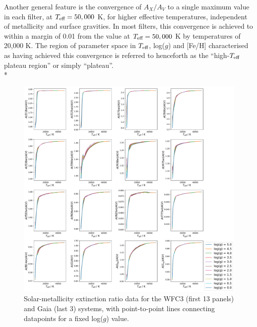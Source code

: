 \documentclass[12pt, a4paper]{report}
\begin{document}
Another general feature is the convergence of $A_{X}/A_{V}$ to a single maximum value in each filter, at $T_{\textnormal{eff}} = 50,000$ K, for higher effective temperatures, independent of metallicity and surface gravities. In most filters, this convergence is achieved to within a margin of 0.01 from the value at $T_{\textnormal{eff}} = 50,000$ K by temperatures of 20,000 K. The region of parameter space in $T_{\textnormal{eff}}$, log($g$) and [Fe/H] characterised as having achieved this convergence is referred to henceforth as the ``high-$T_{\textnormal{eff}}$ plateau region'' or simply ``plateau''.\\*

\begin{figure}[h]
\begin{center}
\includegraphics[width=1.0\textwidth]{../just_full_data/comb/AHub_FeH0p0_just_Teff_plot_lines.pdf}
\caption{Solar-metallicity extinction ratio data for the WFC3 (first 13 panels) and Gaia (last 3) systems, with point-to-point lines connecting datapoints for a fixed log($g$) value.}
\label{just_data_FeH0_WFC3gaia}
\end{center}
\end{figure}
\end{document}
